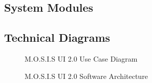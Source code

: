 \subsection{System Modules}
\subsection{Technical Diagrams}
\begin{center}
\begin{figure}[H]
  \centering
	\caption[]{M.O.S.I.S UI 2.0 Use Case Diagram}
\end{figure}
\begin{figure}[H]
	\caption[]{M.O.S.I.S UI 2.0 Software Architecture}
\end{figure}
\end{center}
